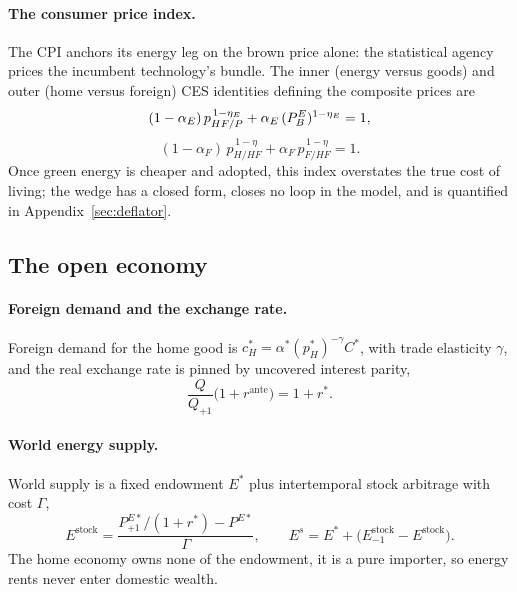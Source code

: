 \paragraph{The consumer price index.}
The CPI anchors its energy leg on the brown price alone: the statistical agency
prices the incumbent technology's bundle. The inner (energy versus goods) and
outer (home versus foreign) CES identities defining the composite prices are
%
\begin{equation}
(1-\alpha_E)\,p_{HF/P}^{\,1-\eta_E}+\alpha_E\,(P^{E}_{B})^{1-\eta_E}=1,
\label{eq:innernest}
\end{equation}
\begin{equation}
(1-\alpha_F)\,p_{H/HF}^{\,1-\eta}+\alpha_F\,p_{F/HF}^{\,1-\eta}=1.
\label{eq:outernest}
\end{equation}
%
Once green energy is cheaper and adopted, this index overstates the true cost of
living; the wedge has a closed form, closes no loop in the model, and is
quantified in Appendix~\ref{sec:deflator}.

\subsection{The open economy}\label{sec:open}\label{sec:bop}

\paragraph{Foreign demand and the exchange rate.}
Foreign demand for the home good is $c^{*}_H=\alpha^{*}(p^{*}_H)^{-\gamma}C^{*}$,
with trade elasticity $\gamma$, and the real exchange rate is pinned by uncovered
interest parity,
%
\begin{equation}
\frac{Q}{Q_{+1}}\bigl(1+r^{\mathrm{ante}}\bigr)=1+r^{*}.
\label{eq:uip}
\end{equation}

\paragraph{World energy supply.}
World supply is a fixed endowment $E^{*}$ plus intertemporal stock
arbitrage with cost $\Gamma$,
%
\begin{equation}
E^{\mathrm{stock}}=\frac{P^{E*}_{+1}/(1+r^{*})-P^{E*}}{\Gamma},
\qquad
E^{s}=E^{*}
+\bigl(E^{\mathrm{stock}}_{-1}-E^{\mathrm{stock}}\bigr).
\label{eq:energy-supply}
\end{equation}
%
The home economy owns none of the endowment, it is a pure importer, so energy
rents never enter domestic wealth.

